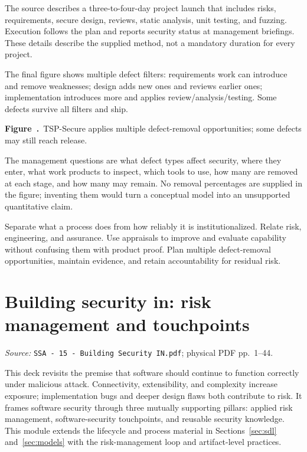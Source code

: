 \documentclass[11pt,a4paper]{article}
\newcommand{\currentmodule}{Contents}
\newcommand{\source}[2]{\textcolor{muted}{\small\textit{Source:} \nolinkurl{#1}; physical PDF pp.~#2.}\par\medskip}
\newcommand{\module}[2]{\par\Needspace{8\baselineskip}\gdef\currentmodule{#1}\section{#1}\label{#2}}
\numberwithin{figure}{section}
\newcommand{\diagramcaption}[1]{\par\smallskip\refstepcounter{figure}\begin{center}\small\textbf{Figure~\thefigure.}~#1\end{center}}
\begin{document}
The source describes a three-to-four-day project launch that includes risks, requirements, secure design, reviews, static analysis, unit testing, and fuzzing. Execution follows the plan and reports security status at management briefings. These details describe the supplied method, not a mandatory duration for every project.

The final figure shows multiple defect filters: requirements work can introduce and remove weaknesses; design adds new ones and reviews earlier ones; implementation introduces more and applies review/analysis/testing. Some defects survive all filters and ship.
\begin{center}\end{center}
\diagramcaption{TSP-Secure applies multiple defect-removal opportunities; some defects may still reach release.}
The management questions are what defect types affect security, where they enter, what work products to inspect, which tools to use, how many are removed at each stage, and how many may remain. No removal percentages are supplied in the figure; inventing them would turn a conceptual model into an unsupported quantitative claim.

\begin{takeaway}
Separate what a process does from how reliably it is institutionalized. Relate risk, engineering, and assurance. Use appraisals to improve and evaluate capability without confusing them with product proof. Plan multiple defect-removal opportunities, maintain evidence, and retain accountability for residual risk.
\end{takeaway}

\module{Building security in: risk management and touchpoints}{sec:building-in}
\source{SSA - 15 - Building Security IN.pdf}{1--44}
This deck revisits the premise that software should continue to function correctly under malicious attack. Connectivity, extensibility, and complexity increase exposure; implementation bugs and deeper design flaws both contribute to risk. It frames software security through three mutually supporting pillars: applied risk management, software-security touchpoints, and reusable security knowledge. This module extends the lifecycle and process material in Sections~\ref{sec:sdl} and~\ref{sec:models} with the risk-management loop and artifact-level practices.
\end{document}
